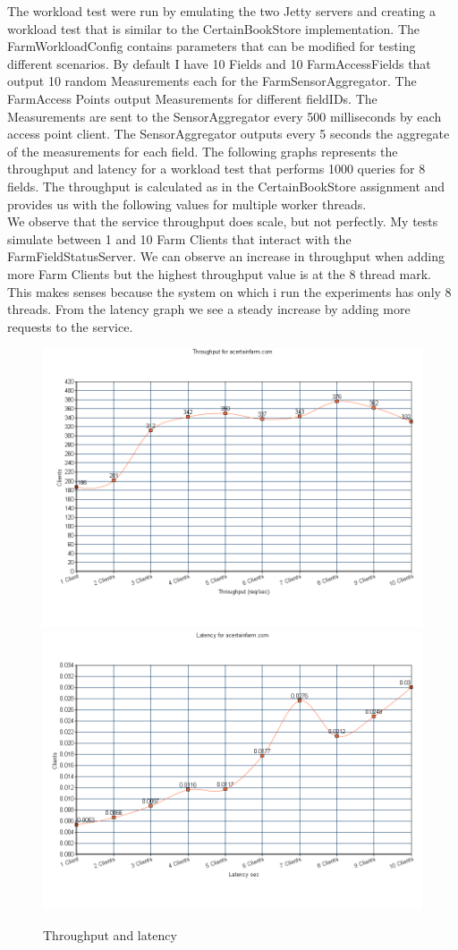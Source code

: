 \documentclass{article}      %
\begin{document}
The workload test were run by emulating the two Jetty servers and creating a workload test that is similar to the CertainBookStore implementation. The FarmWorkloadConfig contains parameters that can be modified for testing different scenarios. By default I have 10 Fields and 10 FarmAccessFields that output 10 random Measurements each for the FarmSensorAggregator. The FarmAccess Points output Measurements for different fieldIDs. The Measurements are sent to the SensorAggregator every 500 milliseconds by each access point client. The SensorAggregator outputs every 5 seconds the aggregate of the measurements for each field. The following graphs represents the throughput and latency for a workload test that performs 1000 queries for 8 fields. The throughput is calculated as in the CertainBookStore assignment and provides us with the following values for multiple worker threads.\\

We observe that the service throughput does scale, but not perfectly. My tests simulate between 1 and 10 Farm Clients that interact with the FarmFieldStatusServer. We can observe an increase in throughput when adding more Farm Clients but the highest throughput value is at the 8 thread mark. This makes senses because the system on which i run the experiments has only 8 threads. From the latency graph we see a steady increase by adding more requests to the service. 

\begin{figure}[ht]
\centering

{%
\setlength{\fboxsep}{5pt}%
\includegraphics[scale=.23]{img/throughput}%
\includegraphics[scale=.23]{img/latency}%
}%
\caption{Throughput and latency\label{overflow}}
\end{figure}
\end{document}
